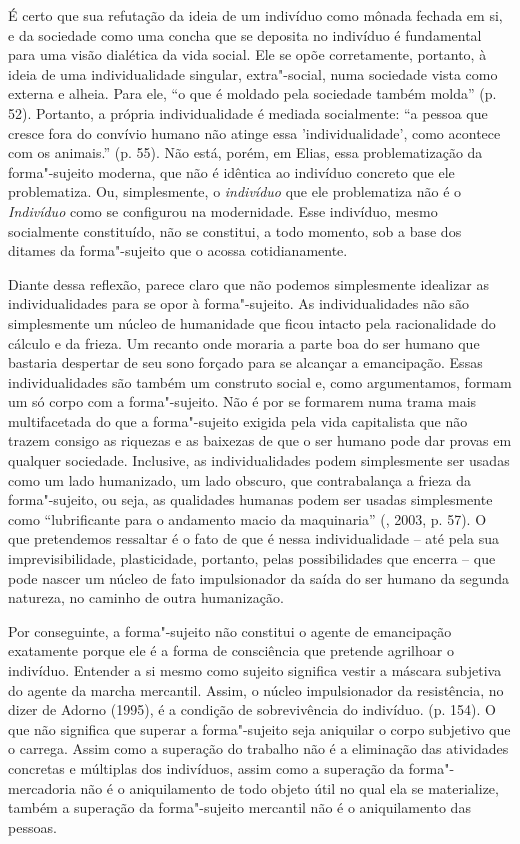 É certo que sua refutação da ideia de um indivíduo como mônada fechada
em si, e da sociedade como uma concha que se deposita no indivíduo é
fundamental para uma visão dialética da vida social. Ele se opõe
corretamente, portanto, à ideia de uma individualidade singular,
extra"-social, numa sociedade vista como externa e alheia. Para ele, ``o
que é moldado pela sociedade também molda'' (p. 52). Portanto, a própria
individualidade é mediada socialmente: ``a pessoa que cresce fora do
convívio humano não atinge essa 'individualidade', como acontece com os
animais.'' (p. 55). Não está, porém, em Elias, essa problematização da
forma"-sujeito moderna, que não é idêntica ao indivíduo concreto que ele
problematiza. Ou, simplesmente, o \emph{indivíduo} que ele problematiza
não é o \emph{Indivíduo} como se configurou na modernidade. Esse
indivíduo, mesmo socialmente constituído, não se constitui, a todo
momento, sob a base dos ditames da forma"-sujeito que o acossa
cotidianamente.

Diante dessa reflexão, parece claro que não podemos simplesmente
idealizar as individualidades para se opor à forma"-sujeito. As
individualidades não são simplesmente um núcleo de humanidade que ficou
intacto pela racionalidade do cálculo e da frieza. Um recanto onde
moraria a parte boa do ser humano que bastaria despertar de seu sono
forçado para se alcançar a emancipação. Essas individualidades são
também um construto social e, como argumentamos, formam um só corpo com
a forma"-sujeito. Não é por se formarem numa trama mais multifacetada do
que a forma"-sujeito exigida pela vida capitalista que não trazem consigo
as riquezas e as baixezas de que o ser humano pode dar provas em
qualquer sociedade. Inclusive, as individualidades podem simplesmente
ser usadas como um lado humanizado, um lado obscuro, que contrabalança a
frieza da forma"-sujeito, ou seja, as qualidades humanas podem ser usadas
simplesmente como ``lubrificante para o andamento macio da maquinaria''
(, 2003, p. 57). O que pretendemos ressaltar é o fato de que é
nessa individualidade -- até pela sua imprevisibilidade, plasticidade,
portanto, pelas possibilidades que encerra -- que pode nascer um núcleo
de fato impulsionador da saída do ser humano da segunda natureza, no
caminho de outra humanização.

Por conseguinte, a forma"-sujeito não constitui o agente de emancipação
exatamente porque ele é a forma de consciência que pretende agrilhoar o
indivíduo. Entender a si mesmo como sujeito significa vestir a máscara
subjetiva do agente da marcha mercantil. Assim, o núcleo impulsionador
da resistência, no dizer de Adorno (1995), é a condição de sobrevivência
do indivíduo. (p. 154). O que não significa que superar a forma"-sujeito
seja aniquilar o corpo subjetivo que o carrega. Assim como a superação
do trabalho não é a eliminação das atividades concretas e múltiplas dos
indivíduos, assim como a superação da forma"-mercadoria não é o
aniquilamento de todo objeto útil no qual ela se materialize, também a
superação da forma"-sujeito mercantil não é o aniquilamento das pessoas.


